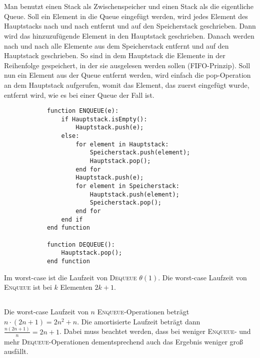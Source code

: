 \documentclass[10pt,a4paper,oneside,ngerman,numbers=noenddot]{scrartcl}
\begin{document}
\section{} %
	\subsection{} %
		Man benutzt einen Stack als Zwischenspeicher und einen Stack als die eigentliche Queue. Soll ein Element in die Queue eingefügt werden, wird jedes Element des Hauptstacks nach und nach entfernt und auf den Speicherstack geschrieben. Dann wird das hinzuzufügende Element in den Hauptstack geschrieben. Danach werden nach und nach alle Elemente aus dem Speicherstack entfernt und auf den Hauptstack geschrieben. So sind in dem Hauptstack die Elemente in der Reihenfolge gespeichert, in der sie ausgelesen werden sollen (FIFO-Prinzip). Soll nun ein Element aus der Queue entfernt werden, wird einfach die pop-Operation an dem Hauptstack aufgerufen, womit das Element, das zuerst eingefügt wurde, entfernt wird, wie es bei einer Queue der Fall ist.
		
		\begin{verbatim}
			function ENQUEUE(e):
			    if Hauptstack.isEmpty():
			        Hauptstack.push(e);
			    else:
			        for element in Hauptstack:
			            Speicherstack.push(element);
			            Hauptstack.pop();
			        end for
			        Hauptstack.push(e);
			        for element in Speicherstack:
			            Hauptstack.push(element);
			            Speicherstack.pop();
			        end for
			    end if
			end function
			
			function DEQUEUE():
			    Hauptstack.pop();
			end function
		\end{verbatim}
		
		Im worst-case ist die Laufzeit von \textsc{Dequeue} $\theta(1)$. Die worst-case Laufzeit von \textsc{Enqueue} ist bei $k$ Elementen $2k+1$. 
	\subsection{} %
		Die worst-case Laufzeit von $n$ \textsc{Enqueue}-Operationen beträgt $n \cdot (2n+1) = 2n^{2} + n$. Die amortisierte Laufzeit beträgt dann $\frac{n(2n+1)}{n} = 2n+1$. Dabei muss beachtet werden, dass bei weniger \textsc{Enqueue}- und mehr \textsc{Dequeue}-Operationen dementsprechend auch das Ergebnis weniger groß ausfällt.
\end{document}
